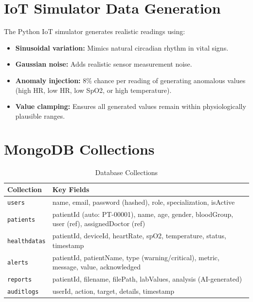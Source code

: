 \section{IoT Simulator Data Generation}
The Python IoT simulator generates realistic readings using:
\begin{itemize}[leftmargin=*]
    \item \textbf{Sinusoidal variation:} Mimics natural circadian rhythm in vital signs.
    \item \textbf{Gaussian noise:} Adds realistic sensor measurement noise.
    \item \textbf{Anomaly injection:} 8\% chance per reading of generating anomalous values (high HR, low HR, low SpO2, or high temperature).
    \item \textbf{Value clamping:} Ensures all generated values remain within physiologically plausible ranges.
\end{itemize}

\section{MongoDB Collections}
\begin{table}[H]
\centering
\caption{Database Collections}
\label{tab:collections}
\begin{tabular}{|l|p{8cm}|}
\hline
\textbf{Collection} & \textbf{Key Fields} \\
\hline
\texttt{users} & name, email, password (hashed), role, specialization, isActive \\
\hline
\texttt{patients} & patientId (auto: PT-00001), name, age, gender, bloodGroup, user (ref), assignedDoctor (ref) \\
\hline
\texttt{healthdatas} & patientId, deviceId, heartRate, spO2, temperature, status, timestamp \\
\hline
\texttt{alerts} & patientId, patientName, type (warning/critical), metric, message, value, acknowledged \\
\hline
\texttt{reports} & patientId, filename, filePath, labValues, analysis (AI-generated) \\
\hline
\texttt{auditlogs} & userId, action, target, details, timestamp \\
\hline
\end{tabular}
\end{table}
